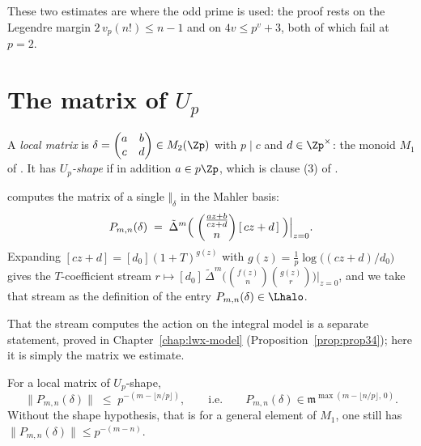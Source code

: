 These two estimates are where the odd prime is used: the proof rests on the Legendre margin
$2\,v_p(n!)\leq n-1$ and on $4v\leq p^{v}+3$, both of which fail at $p=2$.

\section{The matrix of $U_p$}

\begin{definition}
  \label{def:localmat}
  \leanok
  A \emph{local matrix} is $\delta = \begin{pmatrix} a & b\\ c& d\end{pmatrix}\in M_2(\Zp)$ with
  $p \mid c$ and $d \in \Zp^{\times}$: the monoid $M_1$ of \cite[(2.3.3)]{LWX}.  It has
  \emph{$U_p$-shape} if in addition $a \in p\Zp$, which is clause (3) of
  \cite[Proposition 3.1]{LWX}.
\end{definition}

\begin{definition}
  \label{def:entry}
  \leanok
  \cite[Proposition 3.4]{LWX} computes the matrix of a single $\Vert_\delta$ in the Mahler basis:
  \[
    P_{m,n}(\delta) \;=\; \tilde\Delta^{m}\Bigl(\;\binom{\tfrac{az+b}{cz+d}}{n}\,[\,cz+d\,]\;
    \Bigr)\Big|_{z=0} .
  \]
  Expanding $[cz+d] = [d_0](1+T)^{g(z)}$ with $g(z) = \tfrac1p\log\bigl((cz+d)/d_0\bigr)$ gives
  the $T$-coefficient stream
  $r \mapsto [d_0]\,\tilde\Delta^{m}\bigl(\binom{f(z)}{n}\binom{g(z)}{r}\bigr)\big|_{z=0}$,
  and we take that stream as the definition of the entry $P_{m,n}(\delta)\in\Lhalo$.
\end{definition}

That the stream computes the action on the integral model is a separate statement, proved in
Chapter~\ref{chap:lwx-model} (Proposition~\ref{prop:prop34}); here it is simply the matrix we
estimate.

\begin{proposition}
  \label{prop:entry-bound}
  \leanok
  For a local matrix of $U_p$-shape,
  \[
    \bigl\lVert P_{m,n}(\delta)\bigr\rVert \;\leq\; p^{-(m - \lfloor n/p\rfloor)},
    \qquad\text{i.e.}\qquad
    P_{m,n}(\delta) \in \mathfrak{m}^{\max(m-\lfloor n/p\rfloor,\,0)} .
  \]
  Without the shape hypothesis, that is for a general element of $M_1$, one still has
  $\lVert P_{m,n}(\delta)\rVert \leq p^{-(m-n)}$.
\end{proposition}

